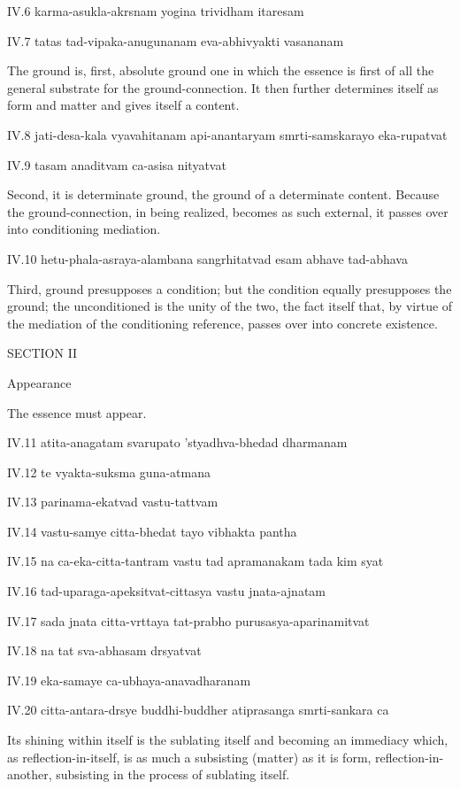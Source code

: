 IV.6
karma-asukla-akrsnam yogina trividham itaresam

IV.7
tatas tad-vipaka-anugunanam eva-abhivyakti vasananam

The ground is, first, absolute ground
one in which the essence is first of all
the general substrate for the ground-connection.
It then further determines itself as form and matter
and gives itself a content.

IV.8
jati-desa-kala vyavahitanam api-anantaryam smrti-samskarayo eka-rupatvat

IV.9
tasam anaditvam ca-asisa nityatvat

Second, it is determinate ground,
the ground of a determinate content.
Because the ground-connection, in being realized,
becomes as such external,
it passes over into conditioning mediation.

IV.10
hetu-phala-asraya-alambana sangrhitatvad esam abhave tad-abhava

Third, ground presupposes a condition;
but the condition equally presupposes the ground;
the unconditioned is the unity of the two,
the fact itself that, by virtue of
the mediation of the conditioning reference,
passes over into concrete existence.

SECTION II

Appearance

The essence must appear.

IV.11
atita-anagatam svarupato 'styadhva-bhedad dharmanam

IV.12
te vyakta-suksma guna-atmana

IV.13
parinama-ekatvad vastu-tattvam

IV.14
vastu-samye citta-bhedat tayo vibhakta pantha

IV.15
na ca-eka-citta-tantram vastu tad apramanakam tada kim syat

IV.16
tad-uparaga-apeksitvat-cittasya vastu jnata-ajnatam

IV.17
sada jnata citta-vrttaya tat-prabho purusasya-aparinamitvat

IV.18
na tat sva-abhasam drsyatvat

IV.19
eka-samaye ca-ubhaya-anavadharanam

IV.20
citta-antara-drsye buddhi-buddher atiprasanga smrti-sankara ca

Its shining within itself is
the sublating itself and
becoming an immediacy which,
as reflection-in-itself, is
as much a subsisting (matter)
as it is form, reflection-in-another,
subsisting in the process of sublating itself.

